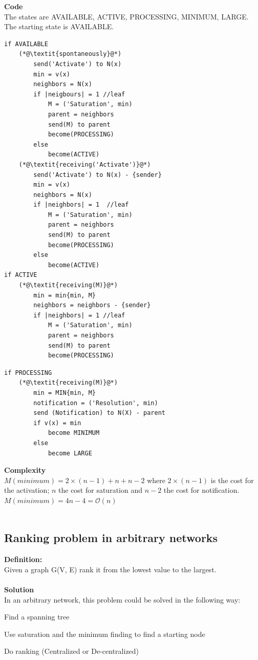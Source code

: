 \documentclass[paper=a4, fontsize=11pt]{scrartcl} %
\numberwithin{equation}{section} %
\numberwithin{figure}{section} %
\numberwithin{table}{section} %
\begin{document}
\textbf{Code} \\
The states are AVAILABLE, ACTIVE, PROCESSING, MINIMUM, LARGE. The starting state is AVAILABLE.
\begin{lstlisting}
if AVAILABLE
	(*@\textit{spontaneously}@*)
		send('Activate') to N(x)
		min = v(x)
		neighbors = N(x)
		if |neigbours| = 1 //leaf
			M = ('Saturation', min)
			parent = neighbors
			send(M) to parent
			become(PROCESSING)
		else
			become(ACTIVE)
	(*@\textit{receiving('Activate')}@*)
		send('Activate') to N(x) - {sender}
		min = v(x)
		neighbors = N(x)
		if |neighbors| = 1	//leaf
			M = ('Saturation', min)
			parent = neighbors
			send(M) to parent
			become(PROCESSING)
		else
			become(ACTIVE)
if ACTIVE
	(*@\textit{receiving(M)}@*)
		min = min{min, M}
		neighbors = neighbors - {sender}
		if |neighbors| = 1 //leaf
			M = ('Saturation', min)
			parent = neighbors	
			send(M) to parent
			become(PROCESSING)
\end{lstlisting}
\newpage
\begin{lstlisting}			
if PROCESSING
	(*@\textit{receiving(M)}@*)
		min = MIN{min, M}
		notification = ('Resolution', min)
		send (Notification) to N(X) - parent
		if v(x) = min
			become MINIMUM
		else
			become LARGE									
\end{lstlisting}
\textbf{Complexity} \\
$M(minimum) = 2\times(n-1) + n + n - 2$ where $2\times(n-1)$ is the cost for the activation; $n$ the cost for saturation and $n - 2$ the cost for notification.$M(minimum) = 4n - 4 = \mathcal{O}(n)$
\\ ~ \\
\subsection*{Ranking problem in arbitrary networks}
\textbf{Definition:} \\Given a graph G(V, E) rank it from the lowest value to the largest.\\ ~ \\
\textbf{Solution}\\In an arbitrary network, this problem could be solved in the following way:
\begin{compactitem}
\item Find a spanning tree
\item Use saturation and the minimum finding to find a starting node
\item Do ranking (Centralized or De-centralized)
\end{compactitem}
\end{document}

